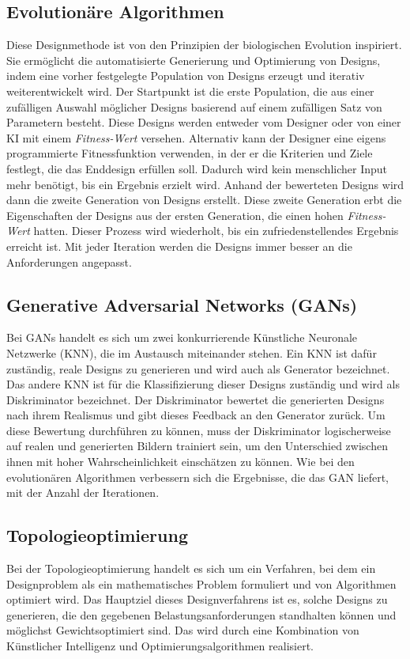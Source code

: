 \subsection*{Evolutionäre Algorithmen}
Diese Designmethode ist von den Prinzipien der biologischen Evolution inspiriert. Sie ermöglicht die automatisierte Generierung und Optimierung von Designs, indem eine vorher festgelegte Population von Designs erzeugt und iterativ weiterentwickelt wird.
Der Startpunkt ist die erste Population, die aus einer zufälligen Auswahl möglicher Designs basierend auf einem zufälligen Satz von Parametern besteht. Diese Designs werden entweder vom Designer oder von einer KI mit einem \textit{Fitness-Wert} versehen. Alternativ kann der Designer eine eigens programmierte Fitnessfunktion verwenden, in der er die Kriterien und Ziele festlegt, die das Enddesign erfüllen soll. Dadurch wird kein menschlicher Input mehr benötigt, bis ein Ergebnis erzielt wird. Anhand der bewerteten Designs wird dann die zweite Generation von Designs erstellt. Diese zweite Generation erbt die Eigenschaften der Designs aus der ersten Generation, die einen hohen \textit{Fitness-Wert} hatten. Dieser Prozess wird wiederholt, bis ein zufriedenstellendes Ergebnis erreicht ist. Mit jeder Iteration werden die Designs immer besser an die Anforderungen angepasst.\autocite{3}

\subsection*{Generative Adversarial Networks (GANs)}
Bei \ac*{GANs} handelt es sich um zwei konkurrierende Künstliche Neuronale Netzwerke (\ac*{KNN}), die im Austausch miteinander stehen. Ein \ac*{KNN} ist dafür zuständig, reale Designs zu generieren und wird auch als Generator bezeichnet. Das andere \ac*{KNN} ist für die Klassifizierung dieser Designs zuständig und wird als Diskriminator bezeichnet. Der Diskriminator bewertet die generierten Designs nach ihrem Realismus und gibt dieses Feedback an den Generator zurück. Um diese Bewertung durchführen zu können, muss der Diskriminator logischerweise auf realen und generierten Bildern trainiert sein, um den Unterschied zwischen ihnen mit hoher Wahrscheinlichkeit einschätzen zu können. Wie bei den evolutionären Algorithmen verbessern sich die Ergebnisse, die das \ac*{GAN} liefert, mit der Anzahl der Iterationen.\autocite{4}\autocite{11}

\label{chap:topology}
\subsection*{Topologieoptimierung}
Bei der Topologieoptimierung handelt es sich um ein Verfahren, bei dem ein Designproblem als ein mathematisches Problem formuliert und von Algorithmen optimiert wird. Das Hauptziel dieses Designverfahrens ist es, solche Designs zu generieren, die den gegebenen Belastungsanforderungen standhalten können und möglichst Gewichtsoptimiert sind. Das wird durch eine Kombination von Künstlicher Intelligenz und Optimierungsalgorithmen realisiert. 

